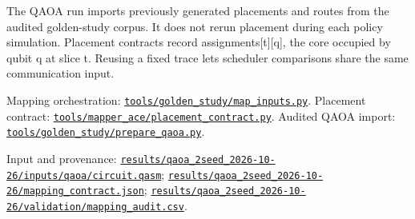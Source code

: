 \documentclass[10pt,a4paper]{article}
\begin{document}
The QAOA run imports previously generated placements and routes from the audited golden-study corpus. It does not rerun placement during each policy simulation. Placement contracts record assignments[t][q], the core occupied by qubit q at slice t. Reusing a fixed trace lets scheduler comparisons share the same communication input.\par
Mapping orchestration: \href{\detokenize{file:///home/dhruv-pansuriya/Documents/BTP/Compiler-Driven-ACE/tools/golden_study/map_inputs.py}}{\nolinkurl{tools/golden_study/map_inputs.py}}. Placement contract: \href{\detokenize{file:///home/dhruv-pansuriya/Documents/BTP/Compiler-Driven-ACE/tools/mapper_ace/placement_contract.py}}{\nolinkurl{tools/mapper_ace/placement_contract.py}}. Audited QAOA import: \href{\detokenize{file:///home/dhruv-pansuriya/Documents/BTP/Compiler-Driven-ACE/tools/golden_study/prepare_qaoa.py}}{\nolinkurl{tools/golden_study/prepare_qaoa.py}}.\par
Input and provenance: \href{\detokenize{file:///home/dhruv-pansuriya/Documents/BTP/Compiler-Driven-ACE/results/qaoa_2seed_2026-10-26/inputs/qaoa/circuit.qasm}}{\nolinkurl{results/qaoa_2seed_2026-10-26/inputs/qaoa/circuit.qasm}}; \href{\detokenize{file:///home/dhruv-pansuriya/Documents/BTP/Compiler-Driven-ACE/results/qaoa_2seed_2026-10-26/mapping_contract.json}}{\nolinkurl{results/qaoa_2seed_2026-10-26/mapping_contract.json}}; \href{\detokenize{file:///home/dhruv-pansuriya/Documents/BTP/Compiler-Driven-ACE/results/qaoa_2seed_2026-10-26/validation/mapping_audit.csv}}{\nolinkurl{results/qaoa_2seed_2026-10-26/validation/mapping_audit.csv}}.\par
\clearpage
\end{document}
